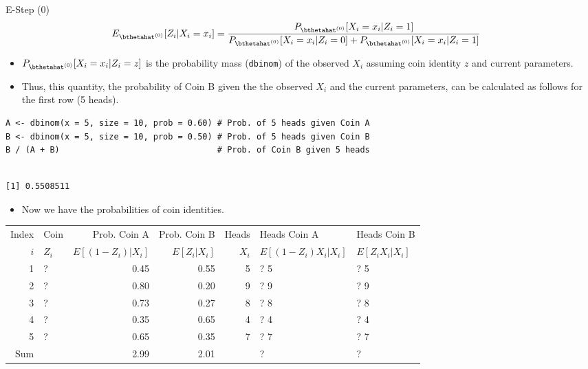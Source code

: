 \documentclass[dvipdfmx,bigger,aspectratio=169]{beamer}
\begin{document}
\begin{frame}[fragile,allowframebreaks,label=,t]{E-Step (0)}
\newpage
\footnotesize
\begin{align*}
  E_{\bthetahat^{(0)}}[Z_{i} | X_{i} = x_{i}]
  &= \frac{P_{\bthetahat^{(0)}}[X_{i} = x_{i} | Z_{i} = 1]}
          {P_{\bthetahat^{(0)}}[X_{i} = x_{i} | Z_{i} = 0] + P_{\bthetahat^{(0)}}[X_{i} = x_{i} | Z_{i} = 1]}
\end{align*}
\normalsize
\begin{itemize}
\item \(P_{\bthetahat^{(0)}}[X_{i} = x_{i} | Z_{i} = z]\) is the probability mass (\texttt{dbinom}) of the observed \(X_{i}\) assuming coin identity \(z\) and current parameters.
\item Thus, this quantity, the probability of Coin B given the the observed \(X_{i}\) and the current parameters, can be calculated as follows for the first row (5 heads).
\end{itemize}
\scriptsize
\begin{verbatim}
A <- dbinom(x = 5, size = 10, prob = 0.60) # Prob. of 5 heads given Coin A
B <- dbinom(x = 5, size = 10, prob = 0.50) # Prob. of 5 heads given Coin B
B / (A + B)                                # Prob. of Coin B given 5 heads
\end{verbatim}

\begin{verbatim}

[1] 0.5508511
\end{verbatim}


\normalsize

\newpage
\begin{itemize}
\item Now we have the probabilities of coin identities.
\end{itemize}
\footnotesize
\begin{center}
\begin{tabular}{r|l|rr|r|ll|}
Index & Coin & Prob. Coin A & Prob. Coin B & Heads & Heads Coin A & Heads Coin B\\
\(i\) & \(Z_{i}\) & \(E[(1-Z_{i})\vert X_{i}]\) & \(E[Z_{i}\vert X_{i}]\) & \(X_{i}\) & \(E[(1-Z_{i}) X_{i} \vert X_{i}]\) & \(E[Z_{i} X_{i} \vert X_{i}]\)\\
\hline
1 & ? & 0.45 & 0.55 & 5 & ? \texttimes{} 5 & ? \texttimes{} 5\\
2 & ? & 0.80 & 0.20 & 9 & ? \texttimes{} 9 & ? \texttimes{} 9\\
3 & ? & 0.73 & 0.27 & 8 & ? \texttimes{} 8 & ? \texttimes{} 8\\
4 & ? & 0.35 & 0.65 & 4 & ? \texttimes{} 4 & ? \texttimes{} 4\\
5 & ? & 0.65 & 0.35 & 7 & ? \texttimes{} 7 & ? \texttimes{} 7\\
\hline
Sum &  & 2.99 & 2.01 &  & ? & ?\\
\end{tabular}
\end{center}
\normalsize


\end{frame}
\end{document}
